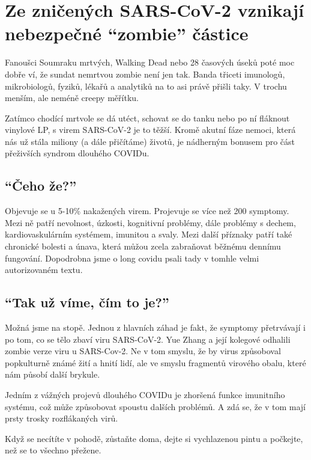 \documentclass[main.tex]{subfiles}
\begin{document}
\section{Ze zničených SARS-CoV-2 vznikají nebezpečné “zombie” částice}
Fanoušci Soumraku mrtvých, Walking Dead nebo 28 časových úseků poté moc dobře ví, že sundat nemrtvou zombie není jen tak. Banda třiceti imunologů, mikrobiologů, fyziků, lékařů a analytiků na to asi právě přišli taky. V trochu menším, ale neméně creepy měřítku.\par
Zatímco chodící mrtvole se dá utéct, schovat se do tanku nebo po ní fláknout vinylové LP, s virem SARS-CoV-2 je to těžší. Kromě akutní fáze nemoci, která nás už stála miliony (a dále přičítáme) životů, je nádherným bonusem pro část přeživších syndrom dlouhého COVIDu. 
\subsection*{\enquote{Čeho že?}}
Objevuje se u 5-10\% nakažených virem. Projevuje se více než 200 symptomy. Mezi ně patří nevolnost, úzkosti, kognitivní problémy, dále problémy s dechem, kardiovaskulárním systémem, imunitou a svaly. Mezi další příznaky patří také chronické bolesti a únava, která můžou zcela zabraňovat běžnému dennímu fungování. Dopodrobna jsme o long covidu psali tady v tomhle velmi autorizovaném textu.
\subsection*{\enquote{Tak už víme, čím to je?}}
Možná jsme na stopě. Jednou z hlavních záhad je fakt, že symptomy přetrvávají i po tom, co se tělo zbaví viru SARS-CoV-2. Yue Zhang a její kolegové odhalili zombie verze viru u SARS-Cov-2. Ne v tom smyslu, že by virus způsoboval popkulturně známé žití a hnití lidí, ale ve smyslu fragmentů virového obalu, které nám působí další brykule.\par
Jedním z vážných projevů dlouhého COVIDu je zhoršená funkce imunitního systému, což může způsobovat spoustu dalších problémů. A zdá se, že v tom mají prsty trosky rozflákaných virů.\par
Když se necítíte v pohodě, zůstaňte doma, dejte si vychlazenou pintu a počkejte, než se to všechno přežene. 
\end{document}
